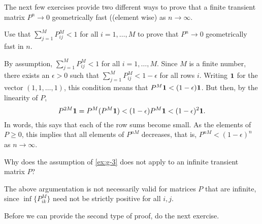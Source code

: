 The next few exercises provide two different ways to prove that a finite transient matrix $P^n\to 0$ geometrically fast ((element wise) as $n\to\infty$. 

\begin{exercise}
Use that $\sum_{j=1}^M P^M_{i j} <1$ for all $i=1,\ldots, M$ to prove that $P^n \to 0$ geometrically fast in $n$. 
\begin{solution}
By assumption, $\sum_{j=1}^M P^M_{i j} <1$ for all $i=1,\ldots,M$. Since $M$ is a finite number, there exists an $\epsilon>0$ such that $\sum_{j=1}^M P^M_{i j} < 1-\epsilon$ for all rows $i$. 
Writing $\bf{1}$ for the vector $(1,1,\ldots, 1)$, this condition means that $P^M{\bf 1} < (1-\epsilon) {\bf 1}$. But then, by the linearity of $P$,
\begin{equation*}
  P^{2M} {\bf 1} = P^M(P^M{\bf 1}) < (1-\epsilon) P^M {\bf 1} < (1-\epsilon)^2 {\bf 1}. 
\end{equation*}
In words, this says that each of the row sums become small. As the elements of $P\geq 0$, this implies that all elements of $P^{nM}$ decreases, that is, $P^{nM} < (1-\epsilon)^n$ as $n\to \infty$. 
\end{solution}
\end{exercise}


\begin{extra}
  Why does the assumption of \cref{ex:g-3} does not apply to an infinite transient matrix $P$?
\begin{solution}
  The above argumentation is not necessarily valid for matrices $P$ that are infinite, since $\inf\{P^{M}_{ik}\}$ need not be strictly positive for all $i, j$. 
\end{solution}
\end{extra}

Before we can provide the second type of proof, do the next exercise.

